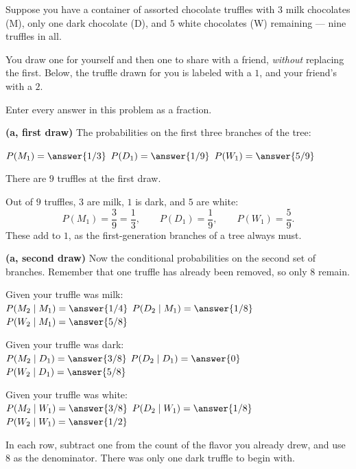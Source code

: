\documentclass[12pt]{ximera}
\begin{document}
\begin{problem}
Suppose you have a container of assorted chocolate truffles with $3$ milk chocolates
(M), only one dark chocolate (D), and $5$ white chocolates (W) remaining --- nine
truffles in all.

You draw one for yourself and then one to share with a friend, \emph{without}
replacing the first. Below, the truffle drawn for you is labeled with a $1$, and
your friend's with a $2$.

Enter every answer in this problem as a fraction.

\begin{prompt}
\textbf{(a, first draw)} The probabilities on the first three branches of the tree:

$P(M_1)=\answer{1/3}$ \qquad
$P(D_1)=\answer{1/9}$ \qquad
$P(W_1)=\answer{5/9}$

\begin{hint}
There are $9$ truffles at the first draw.
\end{hint}

\begin{feedback}
Out of $9$ truffles, $3$ are milk, $1$ is dark, and $5$ are white:
\[
P(M_1)=\frac39=\frac13, \qquad P(D_1)=\frac19, \qquad P(W_1)=\frac59.
\]
These add to $1$, as the first-generation branches of a tree always must.
\end{feedback}
\end{prompt}

\begin{prompt}
\textbf{(a, second draw)} Now the conditional probabilities on the second set of
branches. Remember that one truffle has already been removed, so only $8$ remain.

Given your truffle was milk: \\
$P(M_2\mid M_1)=\answer{1/4}$ \quad
$P(D_2\mid M_1)=\answer{1/8}$ \quad
$P(W_2\mid M_1)=\answer{5/8}$

\smallskip
Given your truffle was dark: \\
$P(M_2\mid D_1)=\answer{3/8}$ \quad
$P(D_2\mid D_1)=\answer{0}$ \quad
$P(W_2\mid D_1)=\answer{5/8}$

\smallskip
Given your truffle was white: \\
$P(M_2\mid W_1)=\answer{3/8}$ \quad
$P(D_2\mid W_1)=\answer{1/8}$ \quad
$P(W_2\mid W_1)=\answer{1/2}$

\begin{hint}
In each row, subtract one from the count of the flavor you already drew, and use $8$
as the denominator. There was only one dark truffle to begin with.
\end{hint}


\end{prompt}
\end{problem}
\end{document}
